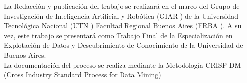 La Redacción y publicación del trabajo se realizará en el marco del Grupo de Investigación de Inteligencia Artificial y Robótica (GIAR ) de la Universidad Tecnológica Nacional (UTN ) Facultad Regional Buenos Aires (FRBA ). A su vez, este trabajo se presentará como Trabajo Final de la Especialización en Explotación de Datos y Descubrimiento de Conocimiento de la Universidad
de Buenos Aires.\\
La documentación del proceso se realiza mediante la Metodología CRISP-DM (Cross Industry Standard Process for Data Mining)